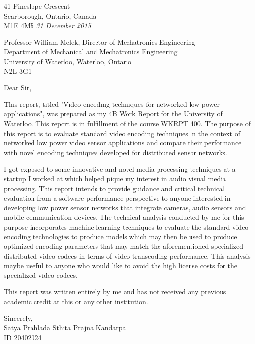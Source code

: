 \begin{flushleft}
    41 Pineslope Crescent\\
    Scarborough, Ontario, Canada\\
    M1E 4M5
    \textit{31 December 2015}
    
    Professor William Melek, Director of Mechatronics Engineering\\
    Department of Mechanical and Mechatronics Engineering\\
    University of Waterloo, Waterloo, Ontario\\
    N2L 3G1
    
    Dear Sir,

    This report, titled "Video encoding techniques for networked low power applications", was prepared as my 4B Work Report for the University of Waterloo. This report is in fulfillment of the course WKRPT 400. The purpose of this report is to evaluate standard video encoding techniques in the context of networked low power video sensor applications and compare their performance with novel encoding techniques developed for distributed sensor networks.
    
    I got exposed to some innovative and novel media processing techniques at a startup I worked at which helped pique my interest in audio visual media processing. This report intends to provide guidance and critical technical evaluation from a software performance perspective to anyone interested in developing low power sensor networks that integrate cameras, audio sensors and mobile communication devices. The technical analysis conducted by me for this purpose incorporates machine learning techniques to evaluate the standard video encoding technologies to produce models which may then be used to produce optimized encoding parameters that may match the aforementioned specialized distributed video codecs in terms of video transcoding performance. This analysis maybe useful to anyone who would like to avoid the high license costs for the specialized video codecs.  
    
    This report was written entirely by me and has not received any previous academic credit at this or any other institution. 

    Sincerely,\\
    Satya Prahlada Sthita Prajna Kandarpa\\
    ID 20402024\\
\end{flushleft}
\cleardoublepage

